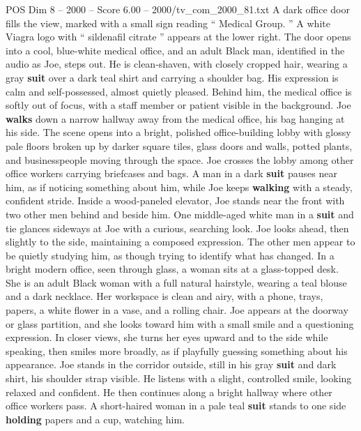 \begin{textsample}{POS Dim 8 – 2000 – Score 6.00 – 2000/tv\_com\_2000\_81.txt}  \label{ex:f8_pos_019}
A dark office door fills the view, marked with a small sign reading “ Medical Group. ” A white Viagra logo with “ sildenafil citrate ” appears at the lower right.
The door opens into a cool, blue-white medical office, and an adult Black man, identified in the audio as Joe, steps out.
He is clean-shaven, with closely cropped hair, wearing a gray \textbf{suit} over a dark teal shirt and carrying a shoulder bag.
His expression is calm and self-possessed, almost quietly pleased.
Behind him, the medical office is softly out of focus, with a staff member or patient visible in the background.
Joe \textbf{walks} down a narrow hallway away from the medical office, his bag hanging at his side.
The scene opens into a bright, polished office-building lobby with glossy pale floors broken up by darker square tiles, glass doors and walls, potted plants, and businesspeople moving through the space.
Joe crosses the lobby among other office workers carrying briefcases and bags.
A man in a dark \textbf{suit} pauses near him, as if noticing something about him, while Joe keeps \textbf{walking} with a steady, confident stride.
Inside a wood-paneled elevator, Joe stands near the front with two other men behind and beside him.
One middle-aged white man in a \textbf{suit} and tie glances sideways at Joe with a curious, searching look.
Joe looks ahead, then slightly to the side, maintaining a composed expression.
The other men appear to be quietly studying him, as though trying to identify what has changed.
In a bright modern office, seen through glass, a woman sits at a glass-topped desk.
She is an adult Black woman with a full natural hairstyle, wearing a teal blouse and a dark necklace.
Her workspace is clean and airy, with a phone, trays, papers, a white flower in a vase, and a rolling chair.
Joe appears at the doorway or glass partition, and she looks toward him with a small smile and a questioning expression.
In closer views, she turns her eyes upward and to the side while speaking, then smiles more broadly, as if playfully guessing something about his appearance.
Joe stands in the corridor outside, still in his gray \textbf{suit} and dark shirt, his shoulder strap visible.
He listens with a slight, controlled smile, looking relaxed and confident.
He then continues along a bright hallway where other office workers pass.
A short-haired woman in a pale teal \textbf{suit} stands to one side \textbf{holding} papers and a cup, watching him.

\end{textsample}
